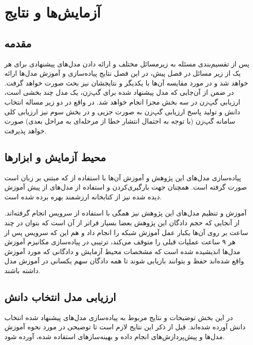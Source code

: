 \chapter{آزمایش‌ها و نتایج}\label{Chap5}
\minitoc

\section{مقدمه}

پس از تقسیم‌بندی مسئله به زیرمسائل مختلف و ارائه دادن مدل‌های پیشنهادی برای هر یک از زیر مسائل در فصل پیش، در این فصل نتایج پیاده‌سازی و آموزش مدل‌ها ارائه خواهد شد و در مورد مقایسه آن‌ها با یکدیگر و نتایجشان نیز بحث صورت خواهد گرفت. در ضمن از آن‌جایی که مدل پیشنهاد شده برای گپ‌زن، یک مدل چند بخشی است، ارزیابی گپ‌زن در سه بخش مجزا انجام خواهد شد. در واقع در دو زیر مساله انتخاب دانش و تولید پاسخ ارزیابی گپ‌زن به صورت جزیی و در بخش سوم نیز ارزیابی کلی سامانه گپ‌زن (با توجه به احتمال انتشار خطا از مرحله‌ای به مراحل بعدی) صورت خواهد پذیرفت.

\section{محیط آزمایش و ابزارها}

پیاده‌سازی مدل‌های این پژوهش و آموزش‌‌ ‌آن‌ها با استفاده از 
که مبتنی بر زبان
است صورت گرفته است. همچنان جهت بارگیری‌کردن و استفاده از مدل‌های از پیش آموزش دیده شده نیز از کتابخانه ارزشمند 
بهره برده شده است. 

آموزش و تنظیم‌ مدل‌های این پژوهش نیز همگی با استفاده از سرویس 
انجام گرفته‌اند. از آنجایی که حجم دادگان این پژوهش بعضا بسیار فراتر از آن است که بتوان در چند ساعت بر روی آن‌ها یکبار عمل آموزش شبکه را انجام داد و هم این که سرویس 
پس از هر ۹ ساعت عملیات قبلی را متوقف می‌کند،‌ ترتیبی در پیاده‌سازی مکانیزم آموزش مدل‌ها اندیشیده شده است که مشخصات محیط آزمایش و دادگانی که مورد آموزش واقع ‌شده‌اند حفظ و بتوانند بازیابی شوند تا همه دادگان سهم یکسانی در آموزش مدل داشته باشند. 



\section{ارزیابی مدل انتخاب دانش}

در این بخش توضیحات و نتایج مربوط به پیاده‌سازی مدل‌های پیشنهاد شده انتخاب دانش آورده شده‌اند. قبل از ذکر این نتایج لازم است تا توضیحی در مورد نحوه آموزش مدل‌ها و پیش‌پردازش‌های انجام داده و بهینه‌سازهای استفاده شده، آورده شود.

